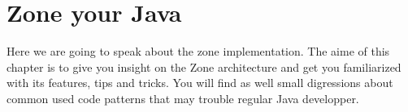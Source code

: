 
\chapter{Zone your Java}

Here we are going to speak about the zone implementation.
The aime of this chapter is to give you insight on the Zone architecture and get you familiarized with its features, tips and tricks.
You will find as well small digressions about common used code patterns that may trouble regular Java developper.